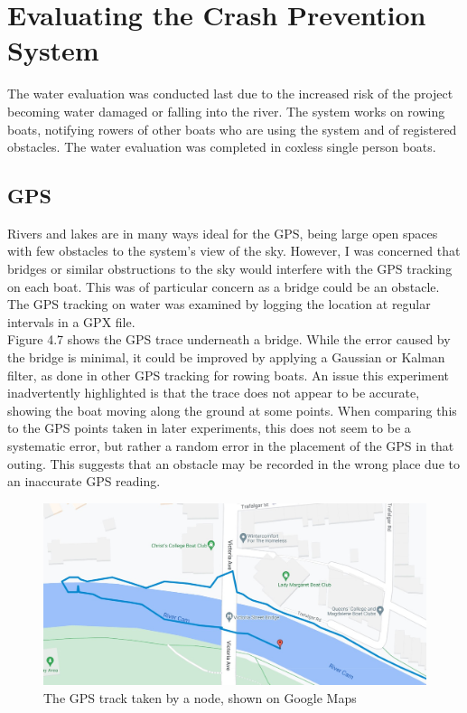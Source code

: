 \documentclass[12pt,a4paper]{report}
\begin{document}
\section{Evaluating the Crash Prevention System}
The water evaluation was conducted last due to the increased risk of the project becoming water damaged or falling into the river. The system works on rowing boats, notifying rowers of other boats who are using the system and of registered obstacles. The water evaluation was completed in coxless single person boats.\\ 

\subsection{GPS}
Rivers and lakes are in many ways ideal for the GPS, being large open spaces with few obstacles to the system's view of the sky. However, I was concerned that bridges or similar obstructions to the sky would interfere with the GPS tracking on each boat. This was of particular concern as a bridge could be an obstacle. The GPS tracking on water was examined by logging the location at regular intervals in a GPX file. \\
Figure 4.7 shows the GPS trace underneath a bridge. While the error caused by the bridge is minimal, it could be improved by applying a Gaussian or Kalman filter, as done in other GPS tracking for rowing boats. An issue this experiment inadvertently highlighted is that the trace does not appear to be accurate, showing the boat moving along the ground at some points. When comparing this to the GPS points taken in later experiments, this does not seem to be a systematic error, but rather a random error in the placement of the GPS in that outing. This suggests that an obstacle may be recorded in the wrong place due to an inaccurate GPS reading.
\begin{figure}[h]
\begin{center}
\includegraphics[scale=0.3]{bridgeGPS.jpg}
\end{center}
\caption{The GPS track taken by a node, shown on Google Maps \cite{googlemapsgeneral}}
\end{figure}
\end{document}
